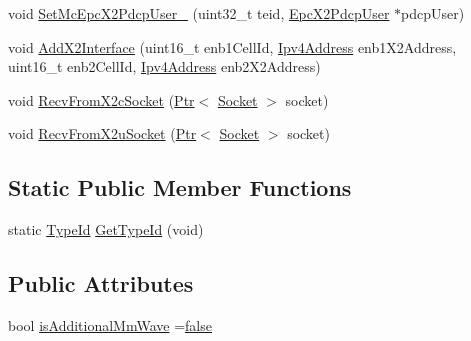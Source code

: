 \begin{DoxyCompactItemize}
\item 
void \hyperlink{classns3_1_1EpcX2_afbf2008beffd05e00caa03f9be34cd40}{Set\+Mc\+Epc\+X2\+Pdcp\+User\+\_} (uint32\+\_\+t teid, \hyperlink{classns3_1_1EpcX2PdcpUser}{Epc\+X2\+Pdcp\+User} $\ast$pdcp\+User)
\item 
void \hyperlink{classns3_1_1EpcX2_a4bcd4423802914da0356051ecf79d2f1}{Add\+X2\+Interface} (uint16\+\_\+t enb1\+Cell\+Id, \hyperlink{classns3_1_1Ipv4Address}{Ipv4\+Address} enb1\+X2\+Address, uint16\+\_\+t enb2\+Cell\+Id, \hyperlink{classns3_1_1Ipv4Address}{Ipv4\+Address} enb2\+X2\+Address)
\item 
void \hyperlink{classns3_1_1EpcX2_a72bf05af65397dab7bc65df72bb09ebf}{Recv\+From\+X2c\+Socket} (\hyperlink{classns3_1_1Ptr}{Ptr}$<$ \hyperlink{classns3_1_1Socket}{Socket} $>$ socket)
\item 
void \hyperlink{classns3_1_1EpcX2_af7142276a4a54af090466d51a31c796f}{Recv\+From\+X2u\+Socket} (\hyperlink{classns3_1_1Ptr}{Ptr}$<$ \hyperlink{classns3_1_1Socket}{Socket} $>$ socket)
\end{DoxyCompactItemize}
\subsection*{Static Public Member Functions}
\begin{DoxyCompactItemize}
\item 
static \hyperlink{classns3_1_1TypeId}{Type\+Id} \hyperlink{classns3_1_1EpcX2_a4c5cfede886af2ff95ede07dda646e7d}{Get\+Type\+Id} (void)
\end{DoxyCompactItemize}
\subsection*{Public Attributes}
\begin{DoxyCompactItemize}
\item 
bool \hyperlink{classns3_1_1EpcX2_a3cc979cc2ca388967ddb4ca05f2d601d}{is\+Additional\+Mm\+Wave} =\hyperlink{lte__cqi__generation_8m_ab1bef239d413c4da139c4bac92cd657a}{false}
\end{DoxyCompactItemize}
